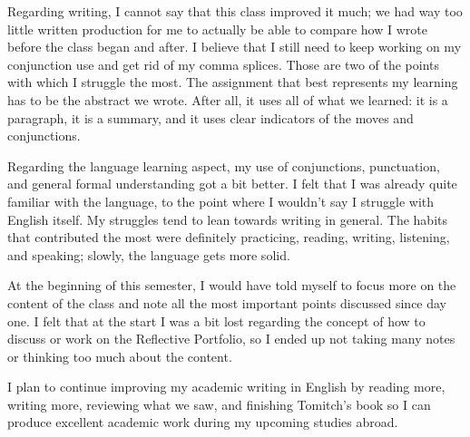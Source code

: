 Regarding writing, I cannot say that this class improved it much; we had way too little written production for me to actually be able to compare how I wrote before the class began and after. I believe that I still need to keep working on my conjunction use and get rid of my comma splices. Those are two of the points with which I struggle the most. The assignment that best represents my learning has to be the abstract we wrote. After all, it uses all of what we learned: it is a paragraph, it is a summary, and it uses clear indicators of the moves and conjunctions.

Regarding the language learning aspect, my use of conjunctions, punctuation, and general formal understanding got a bit better. I felt that I was already quite familiar with the language, to the point where I wouldn't say I struggle with English itself. My struggles tend to lean towards writing in general. The habits that contributed the most were definitely practicing, reading, writing, listening, and speaking; slowly, the language gets more solid.

At the beginning of this semester, I would have told myself to focus more on the content of the class and note all the most important points discussed since day one. I felt that at the start I was a bit lost regarding the concept of how to discuss or work on the Reflective Portfolio, so I ended up not taking many notes or thinking too much about the content.

I plan to continue improving my academic writing in English by reading more, writing more, reviewing what we saw, and finishing Tomitch's book so I can produce excellent academic work during my upcoming studies abroad.

